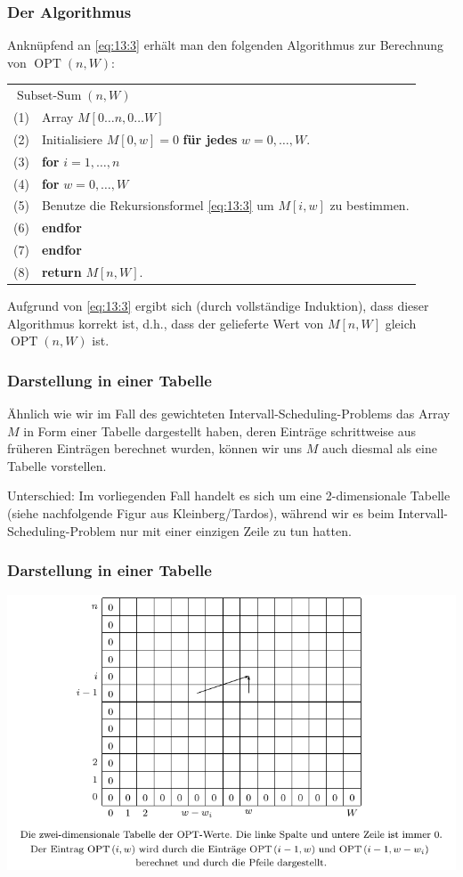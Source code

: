 \documentclass[smaller]{beamer}
\DeclareMathOperator{\opt}{OPT}
\DeclareMathOperator{\ssum}{Subset-Sum}
\begin{document}
\begin{frame}
 \frametitle{Der Algorithmus}
 Anknüpfend an \eqref{eq:13:3} erhält man den folgenden Algorithmus zur Berechnung von $\opt{(n,W)}$:
\begin{center}
\begin{tabular}{rl}
\multicolumn{2}{l}{$\ssum{(n,W)}$} \\
 (1)& Array $M[0 \ldots n, 0 \ldots W]$ \\
 (2)& Initialisiere $M[0,w] = 0$ \textbf{für jedes} $w=0,\ldots,W$. \\
 (3)& \textbf{for} $i=1,\ldots,n$ \\
 (4)& \qquad \textbf{for} $w=0,\ldots,W$ \\ 
 (5)& \qquad\qquad Benutze die Rekursionsformel \eqref{eq:13:3} um $M[i,w]$ zu bestimmen. \\
 (6)& \qquad \textbf{endfor}\\
 (7)& \textbf{endfor} \\
 (8)& \textbf{return} $M[n,W]$.
\end{tabular}
\end{center}
Aufgrund von \eqref{eq:13:3} ergibt sich (durch vollständige Induktion), dass dieser Algorithmus korrekt ist, d.h., dass der gelieferte Wert von $M[n,W]$ gleich $\opt{(n,W)}$ ist.
\end{frame}

\begin{frame}
 \frametitle{Darstellung in einer Tabelle}
Ähnlich wie wir im Fall des gewichteten Intervall-Scheduling-Problems das Array $M$ in Form einer Tabelle dargestellt haben, deren Einträge schrittweise aus früheren Einträgen berechnet wurden, können wir uns $M$ auch diesmal als eine Tabelle vorstellen. \\ \medskip

\alert{Unterschied: Im vorliegenden Fall handelt es sich um eine 2-dimensionale Tabelle} (siehe nachfolgende Figur aus Kleinberg/Tardos), während wir es beim Intervall-Scheduling-Problem nur mit einer einzigen Zeile zu tun hatten.
\end{frame}

\begin{frame}
 \frametitle{Darstellung in einer Tabelle}
 \includegraphics[width=\textwidth]{fig93.pdf}
\end{frame}
\end{document}

